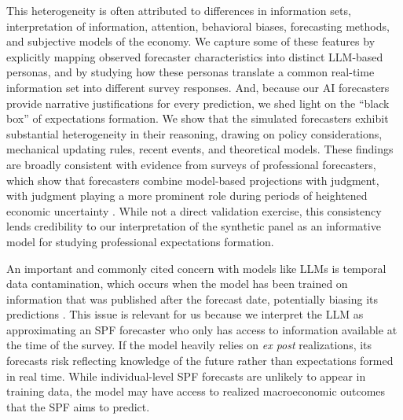 \documentclass[11pt,letterpaper]{scrartcl}
\begin{document}
This heterogeneity is often attributed to differences in information sets, interpretation of information, attention, behavioral biases, forecasting methods, and subjective models of the economy. We capture some of these features by explicitly mapping observed forecaster characteristics into distinct LLM-based personas, and by studying how these personas translate a common real-time information set into different survey responses. And, because our AI forecasters provide narrative justifications for every prediction, we shed light on the ``black box'' of expectations formation. We show that the simulated forecasters exhibit substantial heterogeneity in their reasoning, drawing on policy considerations, mechanical updating rules, recent events, and theoretical models. These findings are broadly consistent with evidence from surveys of professional forecasters, which show that forecasters combine model-based projections with judgment, with judgment playing a more prominent role during periods of heightened economic uncertainty \citep{ecb_spf_specialsurvey_2024}. While not a direct validation exercise, this consistency lends credibility to our interpretation of the synthetic panel as an informative model for studying professional expectations formation.



An important and commonly cited concern with models like LLMs is temporal data contamination, which occurs when the model has been trained on information that was published after the forecast date, potentially biasing its predictions \citep[e.g.,][]{lopez2025memorization, he2025chronologically}. This issue is relevant for us because we interpret the LLM as approximating an SPF forecaster who only has access to information available at the time of the survey. If the model heavily relies on \emph{ex post} realizations, its forecasts risk reflecting knowledge of the future rather than expectations formed in real time. While individual-level SPF forecasts are unlikely to appear in training data, the model may have access to realized macroeconomic outcomes that the SPF aims to predict.
\end{document}
